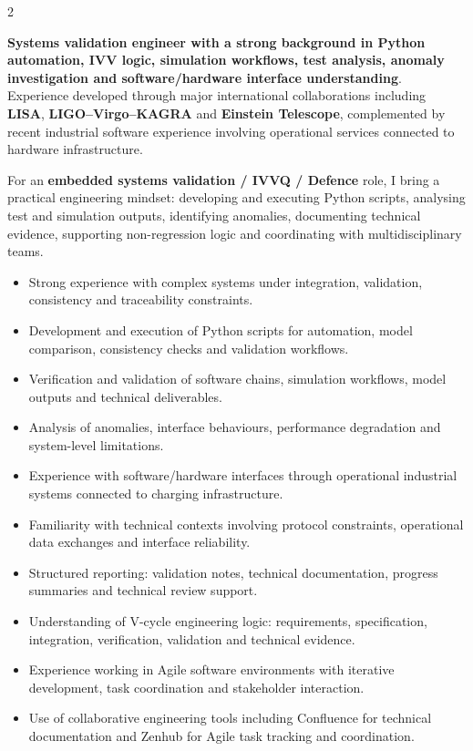 \documentclass[8pt,a4paper,ragged2e,withhyper]{../_shared/altacv}
\begin{document}
\begin{paracol}{2}

\textbf{Systems validation engineer with a strong background in Python automation, IVV logic, simulation workflows, test analysis, anomaly investigation and software/hardware interface understanding}. Experience developed through major international collaborations including \textbf{LISA}, \textbf{LIGO--Virgo--KAGRA} and \textbf{Einstein Telescope}, complemented by recent industrial software experience involving operational services connected to hardware infrastructure.

For an \textbf{embedded systems validation / IVVQ / Defence} role, I bring a practical engineering mindset: developing and executing Python scripts, analysing test and simulation outputs, identifying anomalies, documenting technical evidence, supporting non-regression logic and coordinating with multidisciplinary teams.

\begin{itemize}
  \item Strong experience with complex systems under integration, validation, consistency and traceability constraints.
  \item Development and execution of Python scripts for automation, model comparison, consistency checks and validation workflows.
  \item Verification and validation of software chains, simulation workflows, model outputs and technical deliverables.
  \item Analysis of anomalies, interface behaviours, performance degradation and system-level limitations.
  \item Experience with software/hardware interfaces through operational industrial systems connected to charging infrastructure.
  \item Familiarity with technical contexts involving protocol constraints, operational data exchanges and interface reliability.
  \item Structured reporting: validation notes, technical documentation, progress summaries and technical review support.
  \item Understanding of V-cycle engineering logic: requirements, specification, integration, verification, validation and technical evidence.
  \item Experience working in Agile software environments with iterative development, task coordination and stakeholder interaction.
  \item Use of collaborative engineering tools including Confluence for technical documentation and Zenhub for Agile task tracking and coordination.
\end{itemize}


\end{paracol}
\end{document}
